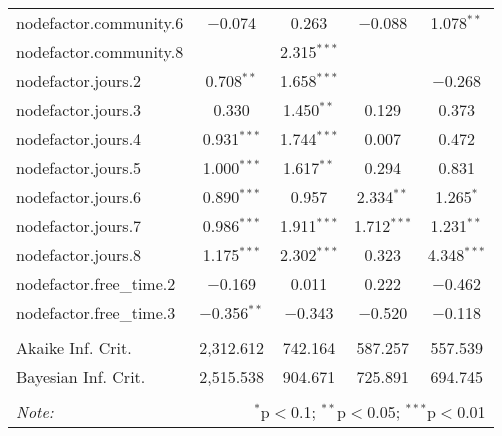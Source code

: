 \documentclass[11pt]{article}
\begin{document}
\begin{table}
\begin{tabular}{@{\extracolsep{5pt}}lcccc}
  nodefactor.community.6 & $-$0.074 & 0.263 & $-$0.088 & 1.078$^{**}$ \\ 
  nodefactor.community.8 &  & 2.315$^{***}$ &  &  \\ 
  nodefactor.jours.2 & 0.708$^{**}$ & 1.658$^{***}$ &  & $-$0.268 \\ 
  nodefactor.jours.3 & 0.330 & 1.450$^{**}$ & 0.129 & 0.373 \\ 
  nodefactor.jours.4 & 0.931$^{***}$ & 1.744$^{***}$ & 0.007 & 0.472 \\ 
  nodefactor.jours.5 & 1.000$^{***}$ & 1.617$^{**}$ & 0.294 & 0.831 \\ 
  nodefactor.jours.6 & 0.890$^{***}$ & 0.957 & 2.334$^{**}$ & 1.265$^{*}$ \\ 
  nodefactor.jours.7 & 0.986$^{***}$ & 1.911$^{***}$ & 1.712$^{***}$ & 1.231$^{**}$ \\ 
  nodefactor.jours.8 & 1.175$^{***}$ & 2.302$^{***}$ & 0.323 & 4.348$^{***}$ \\ 
  nodefactor.free\_time.2 & $-$0.169 & 0.011 & 0.222 & $-$0.462 \\ 
  nodefactor.free\_time.3 & $-$0.356$^{**}$ & $-$0.343 & $-$0.520 & $-$0.118 \\ 
 \hline \\[-1.8ex] 
Akaike Inf. Crit. & 2,312.612 & 742.164 & 587.257 & 557.539 \\ 
Bayesian Inf. Crit. & 2,515.538 & 904.671 & 725.891 & 694.745 \\ 
\hline 
\hline \\[-1.8ex] 
\textit{Note:}  & \multicolumn{4}{r}{$^{*}$p$<$0.1; $^{**}$p$<$0.05; $^{***}$p$<$0.01} \\ 
\end{tabular} 
\end{table} 
\end{document}
